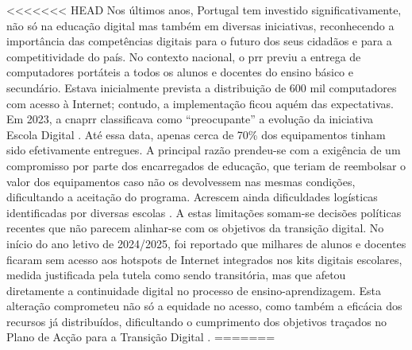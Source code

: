 <<<<<<< HEAD
Nos últimos anos, Portugal tem investido significativamente, não só na educação digital mas também em diversas iniciativas, reconhecendo a importância das competências digitais para o futuro dos seus cidadãos e para a competitividade do país. No contexto nacional, o \acrfull{prr} previu a entrega de computadores portáteis a todos os alunos e docentes do ensino básico e secundário. Estava inicialmente prevista a distribuição de 600 mil computadores com acesso à Internet; contudo, a implementação ficou aquém das expectativas. Em 2023, a \acrfull{cnaprr} classificava como ``preocupante'' a evolução da iniciativa Escola Digital \cite{PRREntregacomputadores}. Até essa data, apenas cerca de 70\% dos equipamentos tinham sido efetivamente entregues. A principal razão prendeu-se com a exigência de um compromisso por parte dos encarregados de educação, que teriam de reembolsar o valor dos equipamentos caso não os devolvessem nas mesmas condições, dificultando a aceitação do programa. Acrescem ainda dificuldades logísticas identificadas por diversas escolas \cite{PRREntregacomputadores}. A estas limitações somam-se decisões políticas recentes que não parecem alinhar-se com os objetivos da transição digital. No início do ano letivo de 2024/2025, foi reportado que milhares de alunos e docentes ficaram sem acesso aos hotspots de Internet integrados nos kits digitais escolares, medida justificada pela tutela como sendo transitória, mas que afetou diretamente a continuidade digital no processo de ensino-aprendizagem. Esta alteração comprometeu não só a equidade no acesso, como também a eficácia dos recursos já distribuídos, dificultando o cumprimento dos objetivos traçados no Plano de Acção para a Transição Digital \cite{ExecutiveDigest2024}.
=======
